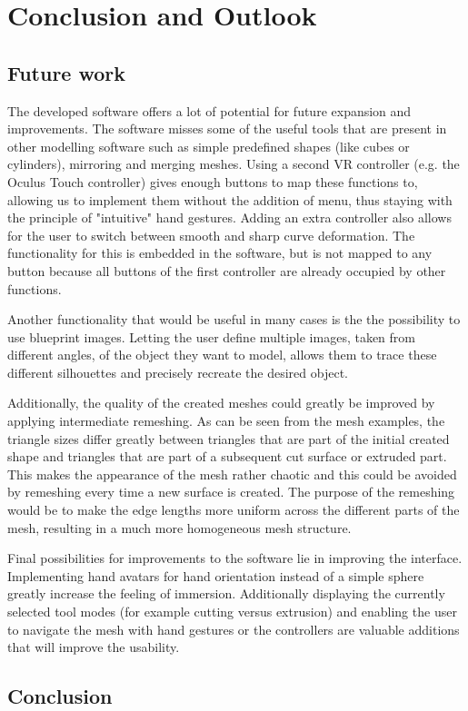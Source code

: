 \chapter{Conclusion and Outlook}


\section{Future work}
The developed software offers a lot of potential for future expansion and improvements. The software misses some of the useful tools that are present in other modelling software such as simple predefined shapes (like cubes or cylinders), mirroring and merging meshes. Using a second VR controller (e.g. the Oculus Touch controller) gives enough buttons to map these functions to, allowing us to implement them without the addition of menu, thus staying with the principle of "intuitive" hand gestures. Adding an extra controller also allows for the user to switch between smooth and sharp curve deformation. The functionality for this is embedded in the software, but is not mapped to any button because all buttons of the first controller are already occupied by other functions. 

Another functionality that would be useful in many cases is the the possibility to use blueprint images. Letting the user define multiple images, taken from different angles, of the object they want to model, allows them to trace these different silhouettes and precisely recreate the desired object.  

Additionally, the quality of the created meshes could greatly be improved by applying intermediate remeshing. As can be seen from the mesh examples, the triangle sizes differ greatly between triangles that are part of the initial created shape and triangles that are part of a subsequent cut surface or extruded part. This makes the appearance of the mesh rather chaotic and this could be avoided by remeshing every time a new surface is created. The purpose of the remeshing would be to make the edge lengths more uniform across the different parts of the mesh, resulting in a much more homogeneous mesh structure.

Final possibilities for improvements to the software lie in improving the interface. Implementing hand avatars for hand orientation instead of a simple sphere greatly increase the feeling of immersion. Additionally displaying the currently selected tool modes (for example cutting versus extrusion) and enabling the user to navigate the mesh with hand gestures or the controllers are valuable additions that will improve the usability. 

\section{Conclusion}